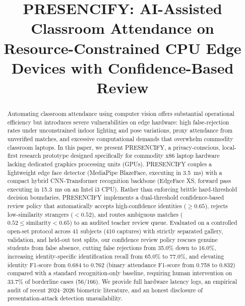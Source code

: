 \documentclass[conference]{IEEEtran}
\begin{document}
\title{PRESENCIFY: AI-Assisted Classroom Attendance on Resource-Constrained CPU Edge Devices with Confidence-Based Review}

\author{
}

\maketitle

\begin{abstract}
Automating classroom attendance using computer vision offers substantial operational efficiency but introduces severe vulnerabilities on edge hardware: high false-rejection rates under unconstrained indoor lighting and pose variations, proxy attendance from unverified matches, and excessive computational demands that overwhelm commodity classroom laptops. In this paper, we present PRESENCIFY, a privacy-conscious, local-first research prototype designed specifically for commodity x86 laptop hardware lacking dedicated graphics processing units (GPUs). PRESENCIFY couples a lightweight edge face detector (MediaPipe BlazeFace, executing in 3.5~ms) with a compact hybrid CNN-Transformer recognition backbone (EdgeFace XS, forward pass executing in 15.3~ms on an Intel i3 CPU). Rather than enforcing brittle hard-threshold decision boundaries, PRESENCIFY implements a dual-threshold confidence-based review policy that automatically accepts high-confidence identities ($\ge 0.65$), rejects low-similarity strangers ($< 0.52$), and routes ambiguous matches ($0.52 \le \text{similarity} < 0.65$) to an audited teacher review queue. Evaluated on a controlled open-set protocol across 41 subjects (410 captures) with strictly separated gallery, validation, and held-out test splits, our confidence review policy rescues genuine students from false absence, cutting false rejections from 35.0\% down to 16.0\%, increasing identity-specific identification recall from 65.0\% to 77.0\%, and elevating identity F1-score from 0.684 to 0.762 (binary attendance F1-score from 0.758 to 0.832) compared with a standard recognition-only baseline, requiring human intervention on 33.7\% of borderline cases (56/166). We provide full hardware latency logs, an empirical audit of recent 2024--2026 biometric literature, and an honest disclosure of presentation-attack detection unavailability.
\end{abstract}
\end{document}
